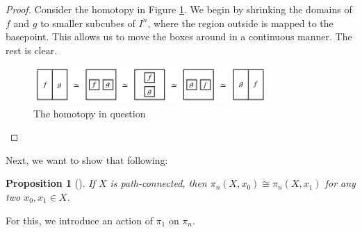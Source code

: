 \documentclass[reqno]{amsart}
\newtheorem{proposition}[theorem]{Proposition}
\theoremstyle{definition}
\theoremstyle{remark}
\begin{document}
  \begin{proof}
      Consider the homotopy in Figure \ref{fig:JIDWOOL0290L-png}.
      We begin by shrinking the domains of $f$ and $g$ to smaller
      subcubes of $I^{n}$, where the region outside is
      mapped to the basepoint. This allows us to move the boxes
      around in a continuous manner. The rest is clear.
      \begin{figure}[htpb]
          \centering
          \includegraphics[width=0.8\textwidth]{Figures/JIDWOOL0290L.png}
          \caption{The homotopy in question}
          \label{fig:JIDWOOL0290L-png}
      \end{figure}
  \end{proof}

  Next, we want to show that following:
  \begin{proposition}[]\label{Prop:SwjiaKKDNW1102}
      If $X$ is path-connected, then
      $\pi_n\left( X, x_0 \right) \cong
      \pi_n (X, x_1)$ for any two $x_0,x_1 \in X$.
  \end{proposition}

  For this, we introduce an action of
  $\pi_1$ on $\pi_n$.
\end{document}
